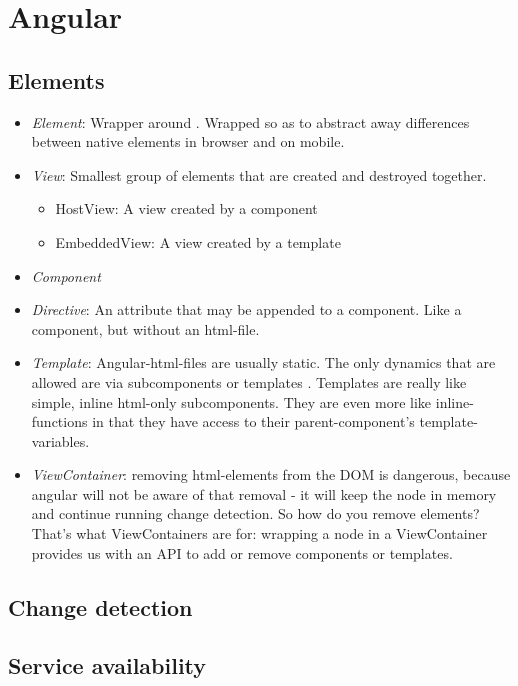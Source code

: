 \section{Angular}


\subsection{Elements}

\begin{itemize}
    \item \emph{Element}: Wrapper around . Wrapped so as to abstract away differences between native elements in browser and on mobile.
    \item \emph{View}: Smallest group of elements that are created and destroyed together.
        \begin{itemize}
            \item HostView: A view created by a component
            \item EmbeddedView: A view created by a template
        \end{itemize}
    \item \emph{Component}
    \item \emph{Directive}: An attribute that may be appended to a component. Like a component, but without an html-file.
    \item \emph{Template}: Angular-html-files are usually static. The only dynamics that are allowed are via subcomponents or templates . Templates are really like simple, inline html-only subcomponents. They are even more like inline-functions in that they have access to their parent-component's template-variables.
    \item \emph{ViewContainer}: removing html-elements from the DOM is dangerous, because angular will not be aware of that removal - it will keep the node in memory and continue running change detection. So how do you remove elements? That's what ViewContainers are for: wrapping a node in a ViewContainer provides us with an API to add or remove components or templates.
\end{itemize}


\subsection{Change detection}

\subsection{Service availability}